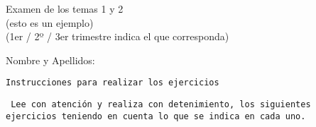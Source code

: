 \documentclass[11pt,a4papper,addpoints]{exam}
\begin{document}
\begin{center}
\Large{
Examen de los temas 1 y 2 \\ (esto es un ejemplo)
} \\
\vspace*{0.5cm}
\normalsize %
(1er / 2º / 3er trimestre indica el que corresponda)
\vspace*{0.5cm}
\\
%
\vspace{1.10cm}
	\begin{flushleft}
	Nombre y Apellidos: \hrulefill\\
	\vspace*{0.50cm}
		\begin{center}
		\small{\texttt{Instrucciones para realizar los ejercicios}}\\		
		\end{center}
	\vspace*{0.5cm}
\small{ %
\texttt{
Lee con atención y realiza con detenimiento, los siguientes ejercicios teniendo en cuenta lo que se indica en cada uno. \\
}} %
%
	\vspace*{0.75cm}		
 	\end{flushleft}
\end{center}

%
\hideanswers %
%
%
\begin{multicols}{2} %
    \begin{enumerate}
    \foreachproblem[loops]{\item\label{prob:\thisproblemlabel}\thisproblem}
    \end{enumerate}
\end{multicols}
%
\newpage

\showanswers
\begin{itemize}
\foreachdataset{\thisdataset}{%
\foreachproblem[\thisdataset]{\item[\ref{prob:\thisproblemlabel}]\thisproblem}
}
\end{itemize}
\end{document}
